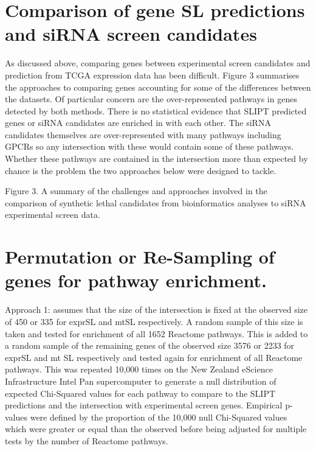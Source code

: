 \section{Comparison of gene SL predictions and siRNA screen candidates}

As discussed above, comparing genes between experimental screen candidates and prediction from TCGA expression data has been difficult. Figure 3 summarises the approaches to comparing genes accounting for some of the differences between the datasets. Of particular concern are the over-represented pathways in genes detected by both methods. There is no statistical evidence that SLIPT predicted genes or siRNA candidates are enriched in with each other. The siRNA candidates themselves are over-represented with many pathways including GPCRs so any intersection with these would contain some of these pathways. Whether these pathways are contained in the intersection more than expected by chance is the problem the two approaches below were designed to tackle.

Figure 3.  A summary of the challenges and approaches involved in the comparison of synthetic lethal candidates from bioinformatics analyses to siRNA experimental screen data. 

\section{Permutation or Re-Sampling of genes for pathway enrichment.}

Approach 1: assumes that the size of the intersection is fixed at the observed size of 450 or 335 for exprSL and mtSL respectively. A random sample of this size is taken and tested for enrichment of all 1652 Reactome pathways. This is added to a random sample of the remaining genes of the observed size 3576 or 2233 for exprSL and mt SL respectively and tested again for enrichment of all Reactome pathways. This was repeated 10,000 times on the New Zealand eScience Infrastructure Intel Pan supercomputer to generate a null distribution of expected Chi-Squared values for each pathway to compare to the SLIPT predictions and the intersection with experimental screen genes. Empirical p-values were defined by the proportion of the 10,000 null Chi-Squared values which were greater or equal than the observed before being adjusted for multiple tests by the number of Reactome pathways.

